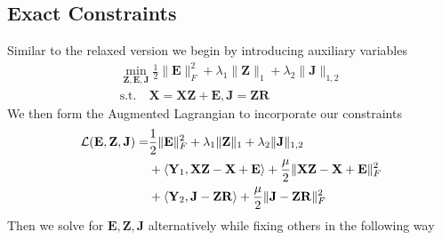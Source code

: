 \documentclass{article}
\begin{document}
\subsection{Exact Constraints}

Similar to the relaxed version we begin by introducing auxiliary variables
\begin{align}
\label{objective_exact}
\min_{\mathbf Z, \mathbf E, \mathbf J} \frac12\|\mathbf E\|^2_F +\lambda_1\|\mathbf Z\|_{1}+\lambda_2\| \mathbf J \|_{1,2}\\
\text{s.t.} \quad \mathbf{X = XZ + E}, \mathbf{J = ZR} \nonumber
\end{align}
We then form the Augmented Lagrangian to incorporate our constraints
\begin{align}
\mathcal{L}(\mathbf E, \mathbf Z, \mathbf J) = & \frac12\|\mathbf E\|^2_F + \lambda_1 \|\mathbf Z\|_{1} + \lambda_2\|\mathbf J\|_{1,2} \notag\\
& + \langle \mathbf Y_1, \mathbf{XZ} - \mathbf X + \mathbf E \rangle +\frac{\mu}2\|\mathbf{XZ} - \mathbf X + \mathbf E\|^2_F \notag\\
& + \langle \mathbf Y_2, \mathbf J - \mathbf Z\mathbf R\rangle +\frac{\mu}2\|\mathbf J - \mathbf Z\mathbf R\|^2_F
\end{align}
Then we solve for $\mathbf{E, Z, J}$ alternatively while fixing others in the following way
\end{document}

